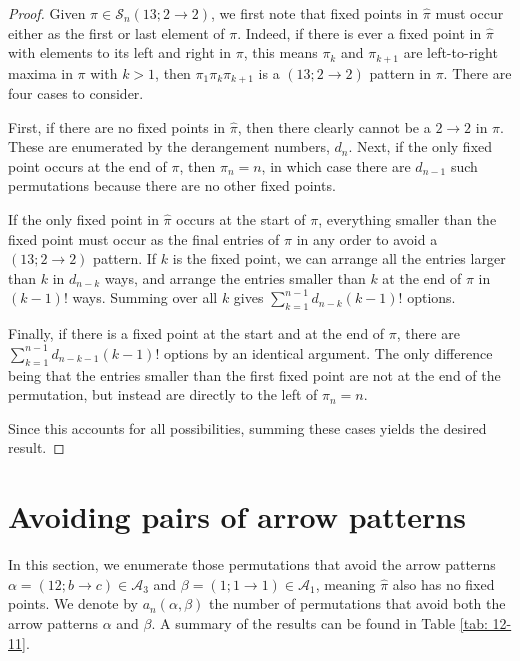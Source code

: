 \documentclass[11pt]{article}
\renewcommand\S{\mathcal S}
\theoremstyle{definition}
\begin{document}
\begin{proof}
    Given $\pi \in \S_n(13; 2\to2)$, we first note that fixed points in $\hat\pi$ must occur either as the first or last element of $\pi$. Indeed, if there is ever a fixed point in $\hat\pi$ with elements to its left and right in $\pi$, this means $\pi_k$ and $\pi_{k+1}$ are left-to-right maxima in $\pi$ with $k > 1$, then $\pi_1 \pi_k\pi_{k+1}$ is a $(13; 2\to2)$ pattern in $\pi$. There are four cases to consider. 
    
    First, if there are no fixed points in $\hat\pi$, then there clearly cannot be a $2\to2$ in $\pi.$ These are enumerated by the derangement numbers, $d_n$. Next, if the only fixed point occurs at the end of $\pi$, then $\pi_n = n$, in which case there are $d_{n-1}$ such permutations because there are no other fixed points.

    If the only fixed point in $\hat\pi$ occurs at the start of $\pi$, everything smaller than the fixed point must occur as the final entries of $\pi$ in any order to avoid a $(13; 2\to2)$ pattern. If $k$ is the fixed point, we can arrange all the entries larger than $k$ in $d_{n-k}$ ways, and arrange the entries smaller than $k$ at the end of $\pi$ in $(k-1)!$ ways. Summing over all $k$ gives $\sum_{k=1}^{n-1} d_{n-k} (k-1)!$ options.

    Finally, if there is a fixed point at the start and at the end of $\pi$, there are $\sum_{k=1}^{n-1} d_{n-k-1}(k-1)!$ options by an identical argument. The only difference being that the entries smaller than the first fixed point are not at the end of the permutation, but instead are directly to the left of $\pi_n = n$.

    Since this accounts for all possibilities, summing these cases yields the desired result.
\end{proof}

\section{Avoiding pairs of arrow patterns} \label{sec:pairs}

In this section, we enumerate those permutations that avoid the arrow patterns $\alpha = (12; b \to c) \in \mathcal{A}_3$ and $\beta = (1; 1\to1) \in \mathcal{A}_1$, meaning $\hat\pi$ also has no fixed points. We denote by $a_n(\alpha,\beta)$ the number of permutations that avoid both the arrow patterns $\alpha$ and $\beta$. A summary of the results can be found in Table \ref{tab: 12-11}.
\end{document}
